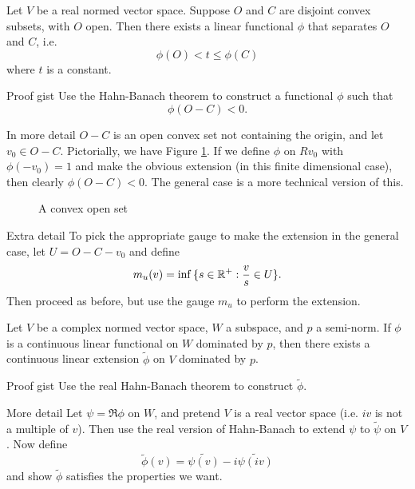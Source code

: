 \begin{thm}
    Let $V$ be a real normed vector space. Suppose $O$ and $C$ are disjoint convex subsets, with $O$ open. Then there exists a linear functional $\phi$ that separates $O$ and $C$, i.e.
    \[
        \phi(O) < t \leq \phi(C)
    \]
    where $t$ is a constant.
\end{thm}

\begin{details}{Proof gist}
Use the Hahn-Banach theorem to construct a functional $\phi$ such that
\[
    \phi(O-C) < 0.
\]
\end{details}
\begin{details}{In more detail}
    $O-C$ is an open convex set not containing the origin, and let $v_0 \in O-C$. Pictorially, we have Figure \ref{fig:A-convex-open-set}.
    If we define $\phi$ on $Rv_0$ with $\phi(-v_0) = 1$ and make the obvious extension (in this finite dimensional case), then clearly $\phi(O-C) < 0$. The general case is a more technical version of this.
\end{details}
\begin{figure}[ht]
    \centering
    \caption{A convex open set}
    \label{fig:A-convex-open-set}
\end{figure}
\begin{details}{Extra detail}
    To pick the appropriate gauge to make the extension in the general case, let $U = O - C - v_0$ and define
    \[
        m_u(v) = \inf{\{s \in {\mathbb R}^+: \frac{v}{s} \in U\}}.
    \]
    Then proceed as before, but use the gauge $m_u$ to perform the extension.
\end{details}
\begin{thm}
    Let $V$ be a complex normed vector space, $W$ a subspace, and $p$ a semi-norm. If $\phi$ is a continuous linear functional on $W$ dominated by $p$, then there exists a continuous linear extension $\tilde{\phi}$ on $V$ dominated by $p$.
\end{thm}

\begin{details}{Proof gist}
    Use the real Hahn-Banach theorem to construct $\tilde{\phi}$.
\end{details}

\begin{details}{More detail}
    Let $\psi = \Re{\phi}$ on $W$, and pretend $V$ is a real vector space (i.e. $iv$ is not a multiple of $v$). Then use the real version of Hahn-Banach to extend $\psi$ to $\tilde{\psi}$ on $V$. Now define
    \[
        \tilde{\phi}(v) = \tilde{\psi(v)} - i\tilde{\psi(iv)}
    \]
    and show $\tilde{\phi}$ satisfies the properties we want.
\end{details}
